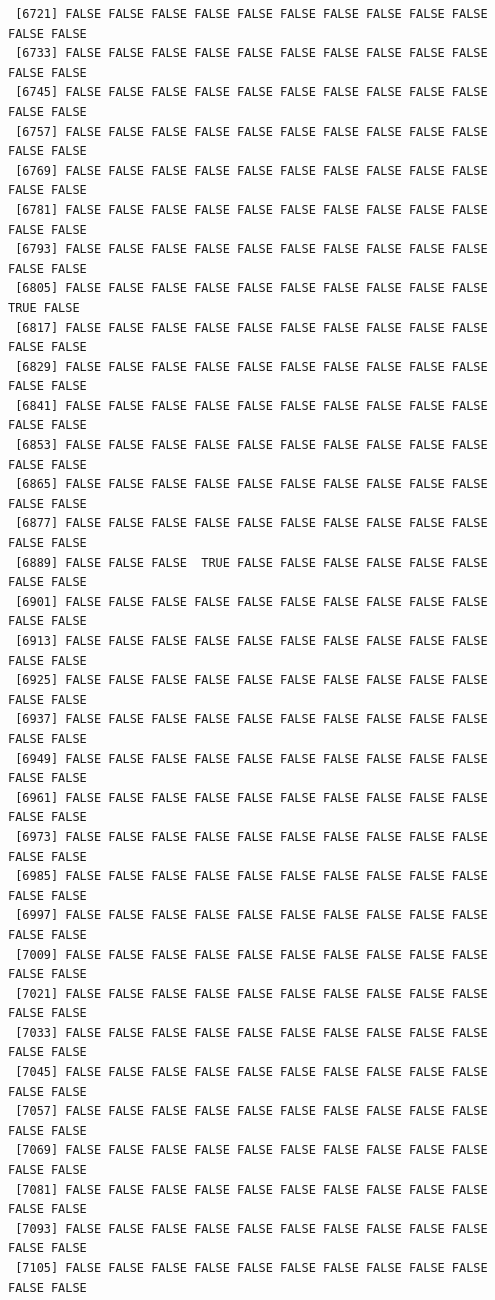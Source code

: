 \documentclass[
  a4paper,
  DIV=11,
  numbers=noendperiod]{scrartcl}
\begin{document}
\begin{verbatim}
 [6721] FALSE FALSE FALSE FALSE FALSE FALSE FALSE FALSE FALSE FALSE FALSE FALSE
 [6733] FALSE FALSE FALSE FALSE FALSE FALSE FALSE FALSE FALSE FALSE FALSE FALSE
 [6745] FALSE FALSE FALSE FALSE FALSE FALSE FALSE FALSE FALSE FALSE FALSE FALSE
 [6757] FALSE FALSE FALSE FALSE FALSE FALSE FALSE FALSE FALSE FALSE FALSE FALSE
 [6769] FALSE FALSE FALSE FALSE FALSE FALSE FALSE FALSE FALSE FALSE FALSE FALSE
 [6781] FALSE FALSE FALSE FALSE FALSE FALSE FALSE FALSE FALSE FALSE FALSE FALSE
 [6793] FALSE FALSE FALSE FALSE FALSE FALSE FALSE FALSE FALSE FALSE FALSE FALSE
 [6805] FALSE FALSE FALSE FALSE FALSE FALSE FALSE FALSE FALSE FALSE  TRUE FALSE
 [6817] FALSE FALSE FALSE FALSE FALSE FALSE FALSE FALSE FALSE FALSE FALSE FALSE
 [6829] FALSE FALSE FALSE FALSE FALSE FALSE FALSE FALSE FALSE FALSE FALSE FALSE
 [6841] FALSE FALSE FALSE FALSE FALSE FALSE FALSE FALSE FALSE FALSE FALSE FALSE
 [6853] FALSE FALSE FALSE FALSE FALSE FALSE FALSE FALSE FALSE FALSE FALSE FALSE
 [6865] FALSE FALSE FALSE FALSE FALSE FALSE FALSE FALSE FALSE FALSE FALSE FALSE
 [6877] FALSE FALSE FALSE FALSE FALSE FALSE FALSE FALSE FALSE FALSE FALSE FALSE
 [6889] FALSE FALSE FALSE  TRUE FALSE FALSE FALSE FALSE FALSE FALSE FALSE FALSE
 [6901] FALSE FALSE FALSE FALSE FALSE FALSE FALSE FALSE FALSE FALSE FALSE FALSE
 [6913] FALSE FALSE FALSE FALSE FALSE FALSE FALSE FALSE FALSE FALSE FALSE FALSE
 [6925] FALSE FALSE FALSE FALSE FALSE FALSE FALSE FALSE FALSE FALSE FALSE FALSE
 [6937] FALSE FALSE FALSE FALSE FALSE FALSE FALSE FALSE FALSE FALSE FALSE FALSE
 [6949] FALSE FALSE FALSE FALSE FALSE FALSE FALSE FALSE FALSE FALSE FALSE FALSE
 [6961] FALSE FALSE FALSE FALSE FALSE FALSE FALSE FALSE FALSE FALSE FALSE FALSE
 [6973] FALSE FALSE FALSE FALSE FALSE FALSE FALSE FALSE FALSE FALSE FALSE FALSE
 [6985] FALSE FALSE FALSE FALSE FALSE FALSE FALSE FALSE FALSE FALSE FALSE FALSE
 [6997] FALSE FALSE FALSE FALSE FALSE FALSE FALSE FALSE FALSE FALSE FALSE FALSE
 [7009] FALSE FALSE FALSE FALSE FALSE FALSE FALSE FALSE FALSE FALSE FALSE FALSE
 [7021] FALSE FALSE FALSE FALSE FALSE FALSE FALSE FALSE FALSE FALSE FALSE FALSE
 [7033] FALSE FALSE FALSE FALSE FALSE FALSE FALSE FALSE FALSE FALSE FALSE FALSE
 [7045] FALSE FALSE FALSE FALSE FALSE FALSE FALSE FALSE FALSE FALSE FALSE FALSE
 [7057] FALSE FALSE FALSE FALSE FALSE FALSE FALSE FALSE FALSE FALSE FALSE FALSE
 [7069] FALSE FALSE FALSE FALSE FALSE FALSE FALSE FALSE FALSE FALSE FALSE FALSE
 [7081] FALSE FALSE FALSE FALSE FALSE FALSE FALSE FALSE FALSE FALSE FALSE FALSE
 [7093] FALSE FALSE FALSE FALSE FALSE FALSE FALSE FALSE FALSE FALSE FALSE FALSE
 [7105] FALSE FALSE FALSE FALSE FALSE FALSE FALSE FALSE FALSE FALSE FALSE FALSE

\end{verbatim}
\end{document}
